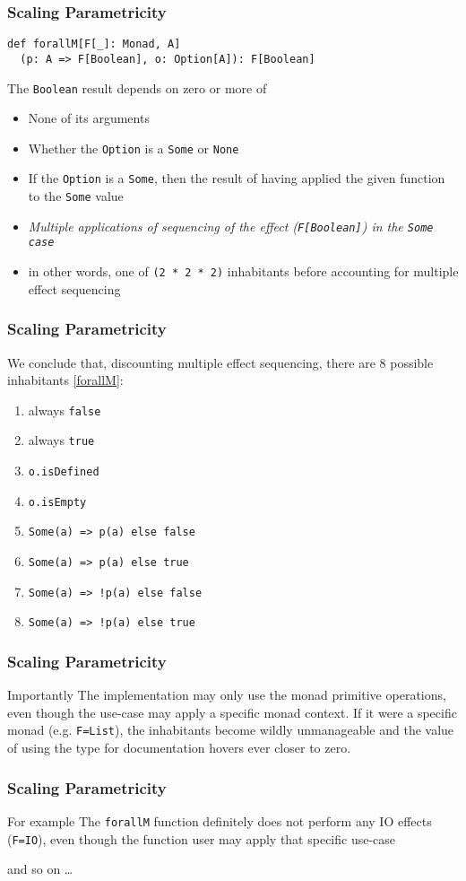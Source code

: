 \begin{frame}[fragile]
\frametitle{Scaling Parametricity}
\begin{lstlisting}[style=scala]
def forallM[F[_]: Monad, A]
  (p: A => F[Boolean], o: Option[A]): F[Boolean]
\end{lstlisting}
\begin{theorem}
  The \lstinline{Boolean} result depends on zero or more of
  \begin{itemize}
    \item None of its arguments
    \item Whether the \lstinline{Option} is a \lstinline{Some} or \lstinline{None}
    \item If the \lstinline{Option} is a \lstinline{Some}, then the result of having applied the given function to the \lstinline{Some} value
    \item \emph{Multiple applications of sequencing of the effect (\lstinline{F[Boolean]}) in the \lstinline{Some case}}
    \item in other words, one of \lstinline{(2 * 2 * 2)} inhabitants before accounting for multiple effect sequencing
  \end{itemize}
\end{theorem}
\end{frame}

\begin{frame}[fragile]
\frametitle{Scaling Parametricity}
  We conclude that, discounting multiple effect sequencing, there are 8 possible inhabitants \ref{forallM}:
  \begin{enumerate}
    \item always \lstinline{false}
    \item always \lstinline{true}
    \item \lstinline{o.isDefined}
    \item \lstinline{o.isEmpty}
    \item \lstinline{Some(a) => p(a) else false}
    \item \lstinline{Some(a) => p(a) else true}
    \item \lstinline{Some(a) => !p(a) else false}
    \item \lstinline{Some(a) => !p(a) else true}
  \end{enumerate}
\end{frame}

\begin{frame}[fragile]
\frametitle{Scaling Parametricity}
  \begin{block}{Importantly}
  The implementation may only use the monad primitive operations, even though the use-case may apply a specific monad context. If it were a specific monad (e.g. \lstinline{F=List}), the inhabitants become wildly unmanageable and the value of using the type for documentation hovers ever closer to zero.
  \end{block}
\end{frame}

\begin{frame}[fragile]
\frametitle{Scaling Parametricity}
  \begin{block}{For example}
  The \lstinline{forallM} function definitely does not perform any IO effects (\lstinline{F=IO}), even though the function user may apply that specific use-case
  \end{block}
  and so on \ldots
\end{frame}
